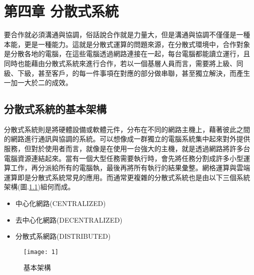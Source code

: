 \chapter{第四章 \quad 分散式系統}
\renewcommand{\baselinestretch}{10} %
\par
\renewcommand{\baselinestretch}{1} %
\twelve \qquad 要合作就必須溝通與協調，俗話說合作就是力量大，但是溝通與協調不僅僅是一種本能，更是一種能力。這就是分散式運算的問題來源，在分散式環境中，合作對象是分散各地的電腦，在這些電腦透過網路連接在一起，每台電腦都能讀立運行，且同時也能藉由分散式系統來進行合作，若以一個基層人員而言，需要將上級、同級、下級，甚至客戶，的每一件事項在對應的部分做串聯，甚至獨立解決，而產生一加一大於二的成效。
\par

\renewcommand{\baselinestretch}{20} %
\section{分散式系統的基本架構}
\par
\renewcommand{\baselinestretch}{1} %
\twelve \qquad 分散式系統則是將硬體設備或軟體元件，分布在不同的網路主機上，藉著彼此之間的網路進行通訊與協調的系統。可以想像成一群獨立的電腦系統集中起來對外提供服務，但對於使用者而言，就像是在使用一台強大的主機，就是透過網路將許多台電腦資源連結起來。當有一個大型任務需要執行時，會先將任務分割成許多小型運算工作，再分派給所有的電腦執，最後再將所有執行的結果彙整。網格運算與雲端運算即是分散式系統常見的應用。而通常更複雜的分散式系統也是由以下三個系統架構(圖.\ref{fig.基本架構})組何而成。
\\
\begin{itemize}
	\item 中心化網路(CENTRALIZED)
	\item 去中心化網路(DECENTRALIZED)
	\item 分散式系網路(DISTRIBUTED)
\end{itemize}
\par

\clearpage%
\renewcommand{\baselinestretch}{2} %
\begin{figure}[hbt!]
\begin{center}
\texttt{[image: 1]}
\caption{\large 基本架構}\label{fig.基本架構}
\end{center}
\end{figure}
\par

